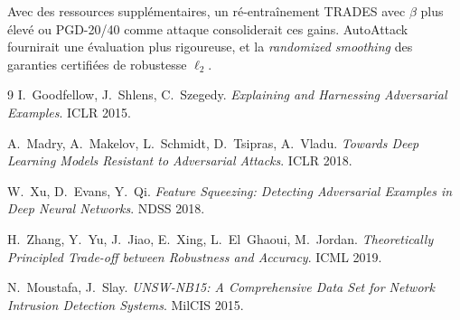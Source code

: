 \documentclass[11pt,a4paper]{article}
\begin{document}
Avec des ressources suppl\'ementaires, un r\'e-entra\^inement TRADES avec $\beta$ plus \'elev\'e
ou PGD-20/40 comme attaque consoliderait ces gains.
AutoAttack fournirait une \'evaluation plus rigoureuse, et la \emph{randomized smoothing}
des garanties certifi\'ees de robustesse $\ell_2$.

\vspace{1em}

\begin{thebibliography}{9}
I.~Goodfellow, J.~Shlens, C.~Szegedy.
\textit{Explaining and Harnessing Adversarial Examples}.
ICLR 2015.

A.~Madry, A.~Makelov, L.~Schmidt, D.~Tsipras, A.~Vladu.
\textit{Towards Deep Learning Models Resistant to Adversarial Attacks}.
ICLR 2018.

W.~Xu, D.~Evans, Y.~Qi.
\textit{Feature Squeezing: Detecting Adversarial Examples in Deep Neural Networks}.
NDSS 2018.

H.~Zhang, Y.~Yu, J.~Jiao, E.~Xing, L.~El~Ghaoui, M.~Jordan.
\textit{Theoretically Principled Trade-off between Robustness and Accuracy}.
ICML 2019.

N.~Moustafa, J.~Slay.
\textit{UNSW-NB15: A Comprehensive Data Set for Network Intrusion Detection Systems}.
MilCIS 2015.
\end{thebibliography}
\end{document}
